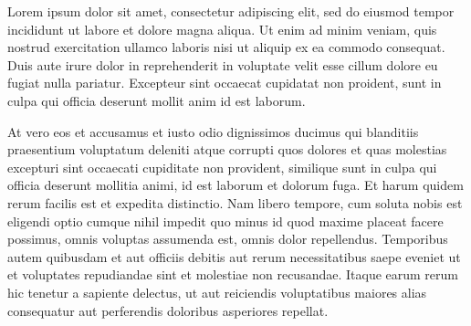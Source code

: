 {}%
Lorem ipsum dolor sit amet, consectetur adipiscing elit, sed do eiusmod tempor incididunt ut labore et dolore magna aliqua. Ut enim ad minim veniam, quis nostrud exercitation ullamco laboris nisi ut aliquip ex ea commodo consequat. Duis aute irure dolor in reprehenderit in voluptate velit esse cillum dolore eu fugiat nulla pariatur. Excepteur sint occaecat cupidatat non proident, sunt in culpa qui officia deserunt mollit anim id est laborum.

At vero eos et accusamus et iusto odio dignissimos ducimus qui blanditiis praesentium voluptatum deleniti atque corrupti quos dolores et quas molestias excepturi sint occaecati cupiditate non provident, similique sunt in culpa qui officia deserunt mollitia animi, id est laborum et dolorum fuga. Et harum quidem rerum facilis est et expedita distinctio. Nam libero tempore, cum soluta nobis est eligendi optio cumque nihil impedit quo minus id quod maxime placeat facere possimus, omnis voluptas assumenda est, omnis dolor repellendus. Temporibus autem quibusdam et aut officiis debitis aut rerum necessitatibus saepe eveniet ut et voluptates repudiandae sint et molestiae non recusandae. Itaque earum rerum hic tenetur a sapiente delectus, ut aut reiciendis voluptatibus maiores alias consequatur aut perferendis doloribus asperiores repellat.


\pagebreak
